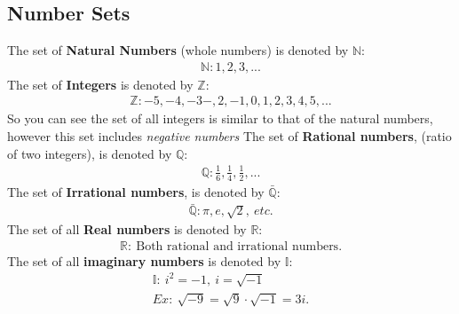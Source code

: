 \documentclass{report}
\begin{document}
    \subsection{Number Sets}
    \bigbreak \noindent 
    The set of \textbf{Natural Numbers} (whole numbers) is denoted by $\mathbb{N}$:
    \begin{align*}
        \mathbb{N}: 1,2,3,..
    .\end{align*}
    \bigbreak \noindent 
    The set of \textbf{Integers} is denoted by $\mathbb{Z}$:
    \begin{align*}
        \mathbb{Z}: -5,-4,-3-,2,-1,0,1,2,3,4,5,..
    .\end{align*}
    \bigbreak \noindent 
    So you can see the set of all integers is similar to that of the natural numbers, however this set includes \textit{negative numbers}
    \bigbreak \noindent 
    The set of \textbf{Rational numbers}, (ratio of two integers), is denoted by $\mathbb{Q} $:
    \begin{align*}
        \mathbb{Q}: \frac{1}{6}, \frac{1}{4}, \frac{1}{2},..
    .\end{align*}
    \bigbreak \noindent 
    The set of \textbf{Irrational numbers}, is denoted by $\bar{\mathbb{Q}} $:
    \begin{align*}
        \bar{\mathbb{Q}}: \pi, e, \sqrt{2},\ etc
    .\end{align*}
    \bigbreak \noindent 
    \bigbreak \noindent \bigbreak \noindent 
    The set of all \textbf{Real numbers} is denoted by $\mathbb{R}$:
    \begin{align*}
        \mathbb{R}:\ \text{Both rational and irrational numbers}
    .\end{align*}
    \bigbreak \noindent 
    The set of all \textbf{imaginary numbers} is denoted by $\mathbb{I}$:
    \begin{align*}
        \mathbb{I}:\ i^{2} = -1,\ i = \sqrt{-1}\\
        Ex:\ \sqrt{-9} = \sqrt{9} \cdot \sqrt{-1} = 3i
    .\end{align*}
\end{document}
